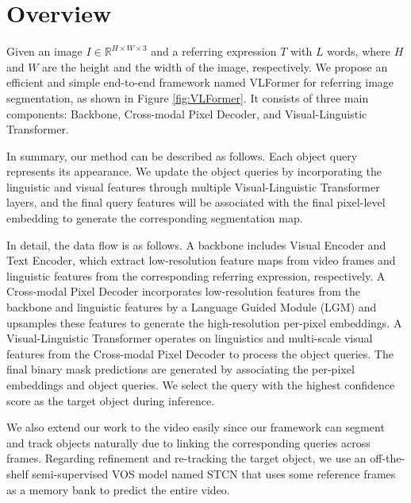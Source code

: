 \section{Overview}
\label{sec:rvos_overview}
Given an image $I \in \mathbb{R}^{H \times W \times 3}$ and a referring expression $T$ with $L$ words, where $H$ and $W$ are the height and the width of the image, respectively. We propose an efficient and simple end-to-end framework named VLFormer for referring image segmentation, as shown in Figure \ref{fig:VLFormer}. It consists of three main components: Backbone, Cross-modal Pixel Decoder, and Visual-Linguistic Transformer. 


In summary, our method can be described as follows. Each object query represents its appearance. We update the object queries by incorporating the linguistic and visual features through multiple Visual-Linguistic Transformer layers, and the final query features will be associated with the final pixel-level embedding to generate the corresponding segmentation map.   

In detail, the data flow is as follows. A backbone includes Visual Encoder and Text Encoder, which extract low-resolution feature maps from video frames and linguistic features from the corresponding referring expression, respectively. A Cross-modal Pixel Decoder incorporates low-resolution features from the backbone and linguistic features by a Language Guided Module (LGM) and upsamples these features to generate the high-resolution per-pixel embeddings. A Visual-Linguistic Transformer operates on linguistics and multi-scale visual features from the Cross-modal Pixel Decoder to process the object queries. The final binary mask predictions are generated by associating the per-pixel embeddings and object queries. We select the query with the highest confidence score as the target object during inference. 

We also extend our work to the video easily since our framework can segment and track objects naturally due to linking the corresponding queries across frames. Regarding refinement and re-tracking the target object, we use an off-the-shelf semi-supervised VOS model named STCN \cite{cheng_rethinking_2021} that uses some reference frames as a memory bank to predict the entire video.

